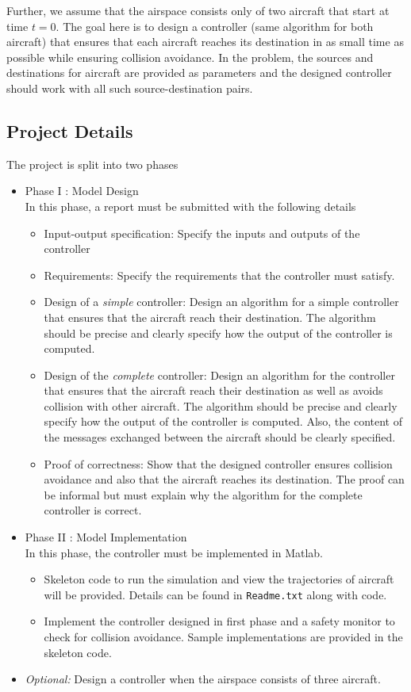 \documentclass[11pt]{article}
\begin{document}
Further, we assume that the airspace consists only of two aircraft that start at time $t = 0$. 
The goal here is to design a controller (same algorithm for both aircraft) that ensures that each aircraft reaches its destination in as small time as possible while ensuring collision avoidance. 
In the problem, the sources and destinations for aircraft are provided as parameters and the designed controller should work with all such source-destination pairs. 

\subsection*{Project Details}
The project is split into two phases
\begin{itemize}
\item Phase I : Model Design\\
In this phase, a report must be submitted with the following details
\begin{itemize}
	\item Input-output specification: Specify the inputs and outputs of the controller
	\item Requirements: Specify the requirements that the controller must satisfy. 
	\item Design of a \emph{simple} controller: Design an algorithm for a simple controller that ensures that the aircraft reach their destination. 
		The algorithm should be precise and clearly specify how the output of the controller is computed. 
	\item Design of the \emph{complete} controller: Design an algorithm for the controller that ensures that the aircraft reach their destination as well as avoids collision with other aircraft. 
		The algorithm should be precise and clearly specify how the output of the controller is computed.  
		Also, the content of the messages exchanged between the aircraft should be clearly specified. 
	\item Proof of correctness: Show that the designed controller ensures collision avoidance and also that the aircraft reaches its destination. The proof can be informal but must explain why the algorithm for the complete controller is correct. 
\end{itemize}

\item Phase II : Model Implementation\\
In this phase, the controller must be implemented in Matlab. 
\begin{itemize}
	\item Skeleton code to run the simulation and view the trajectories of aircraft will be provided. Details can be found in {\tt Readme.txt} along with code. 
	\item Implement the controller designed in first phase and a safety monitor to check for collision avoidance. Sample implementations are provided in the skeleton code. 
\end{itemize}
\item \emph{Optional:} Design a controller when the airspace consists of three aircraft. 
\end{itemize}
\end{document}

